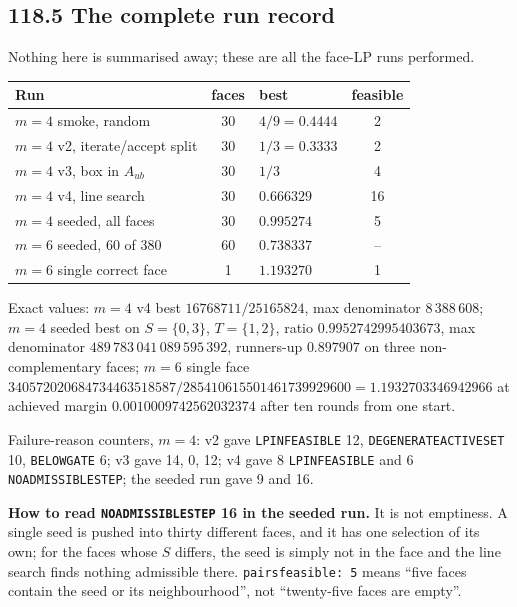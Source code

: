 \documentclass[9pt,twocolumn]{article}
\renewcommand{\_}{\CIGunderscore\allowbreak}
\begin{document}
\subsection*{118.5 The complete run record}
Nothing here is summarised away; these are all the face-LP runs performed.
\begin{center}\scriptsize
\begin{tabularx}{0.98\columnwidth}{>{\raggedright\arraybackslash}p{}cXc}
\toprule
Run & faces & best & feasible\\
\midrule
$m{=}4$ smoke, random & 30 & $4/9=0.4444$ & 2\\
$m{=}4$ v2, iterate/accept split & 30 & $1/3=0.3333$ & 2\\
$m{=}4$ v3, box in $A_{ub}$ & 30 & $1/3$ & 4\\
$m{=}4$ v4, line search & 30 & $0.666329$ & 16\\
$m{=}4$ seeded, all faces & 30 & $\mathbf{0.995274}$ & 5\\
$m{=}6$ seeded, 60 of 380 & 60 & $0.738337$ & --\\
$m{=}6$ single correct face & 1 & $\mathbf{1.193270}$ & 1\\
\bottomrule
\end{tabularx}
\end{center}
Exact values: $m=4$ v4 best $16768711/25165824$, max denominator $8\,388\,608$; $m=4$ seeded best on $S=\{0,3\}$, $T=\{1,2\}$, ratio $0.9952742995403673$, max denominator $489\,783\,041\,089\,595\,392$, runners-up $0.897907$ on three non-complementary faces; $m=6$ single face $340572020684734463518587/285410615501461739929600 = 1.1932703346942966$ at achieved margin $0.0010009742562032374$ after ten rounds from one start.

Failure-reason counters, $m=4$: v2 gave \texttt{LP\_INFEASIBLE} 12, \texttt{DEGENERATE\_ACTIVE\_SET} 10, \texttt{BELOW\_GATE} 6; v3 gave 14, 0, 12; v4 gave 8 \texttt{LP\_INFEASIBLE} and 6 \texttt{NO\_ADMISSIBLE\_STEP}; the seeded run gave 9 and 16.

\textbf{How to read \texttt{NO\_ADMISSIBLE\_STEP} 16 in the seeded run.} It is not emptiness. A single seed is pushed into thirty different faces, and it has one selection of its own; for the faces whose $S$ differs, the seed is simply not in the face and the line search finds nothing admissible there. \texttt{pairs\_feasible: 5} means ``five faces contain the seed or its neighbourhood'', not ``twenty-five faces are empty''.
\end{document}
